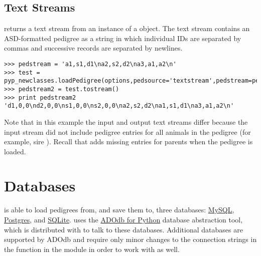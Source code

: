 \subsection{Text Streams}\label{sec:io-output-text-streams}
 returns a text stream from an instance of a  object. The text stream contains an ASD-formatted pedigree as a string in which individual IDs are separated by commas and successive records are separated by newlines.
\begin{verbatim}
>>> pedstream = 'a1,s1,d1\na2,s2,d2\na3,a1,a2\n'
>>> test = pyp_newclasses.loadPedigree(options,pedsource='textstream',pedstream=pedstream)
>>> pedstream2 = test.tostream()
>>> print pedstream2
'd1,0,0\nd2,0,0\ns1,0,0\ns2,0,0\na2,s2,d2\na1,s1,d1\na3,a1,a2\n'
\end{verbatim}
Note that in this example the input and output text streams differ because the input stream did not include pedigree entries for all animals in the pedigree (for example, sire ). Recall that \PyPedal{} adds missing entries for parents when the pedigree is loaded.

\section{Databases}\label{sec:io-databases}
\PyPedal{} is able to load pedigrees from, and save them to, three databases:
\href{http://www.mysql.com/}{MySQL}, \href{http://www.postgresql.org/}{Postgres},
and \href{http://sqlite.org/}{SQLite}. \PyPedal{} uses the 
\href{http://phplens.com/lens/adodb/adodb-py-docs.htm}{ADOdb for Python} database
abstraction tool, which is distributed with \PyPedal{} to talk to these databases.
Additional databases are supported by ADOdb and require only minor changes to the
connection strings in the  function in the 
module in order to work with \PyPedal{} as well.

